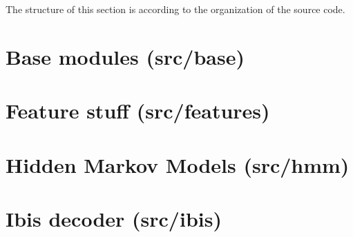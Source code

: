 The structure of this section is according to the organization of the source code.

\section{Base modules (src/base)}













\section{Feature stuff (src/features)}



\section{Hidden Markov Models (src/hmm)}









\section{Ibis decoder (src/ibis)}



































